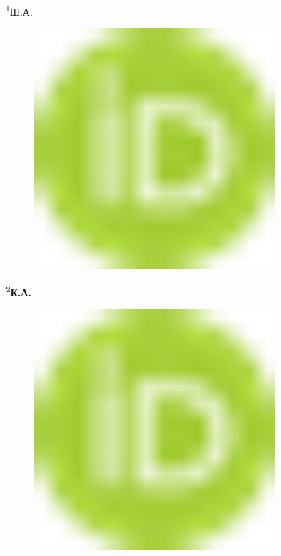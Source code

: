 {\textsuperscript{1}Ш.А.
\begin{figure}[H]
	\centering
	\includegraphics[width=0.8\textwidth]{media/pish4/image1}
	\caption*{}
\end{figure}


{\bfseries \textsuperscript{2}К.А.
\begin{figure}[H]
	\centering
	\includegraphics[width=0.8\textwidth]{media/pish4/image1}
	\caption*{}
\end{figure}

}}
